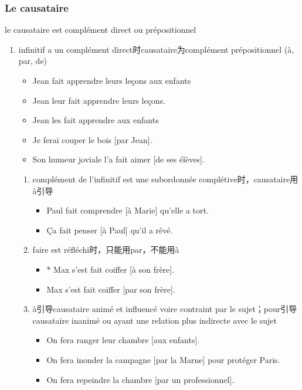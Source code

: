 \documentclass[UTF8]{report}
\begin{document}
\subsubsection{Le causataire}
le causataire est complément direct ou prépositionnel
\begin{enumerate}
    \item infinitif a un complément direct时causataire为complément prépositionnel (à, par, de)
    \begin{itemize}
        \item Jean fait apprendre leurs leçons aux enfants
        \item Jean leur fait apprendre leurs leçons.
        \item Jean les fait apprendre aux enfants
        \item Je ferai couper le bois [par Jean].
        \item Son humeur joviale l’a fait aimer [de ses élèves].
    \end{itemize}
    \begin{enumerate}
        \item complément de l’infinitif est une subordonnée complétive时，causataire用à引导
        \begin{itemize}
            \item Paul fait comprendre [à Marie] qu’elle a tort.
            \item Ça fait penser [à Paul] qu’il a rêvé.
        \end{itemize}
        \item faire est réfléchi时，只能用par，不能用à
        \begin{itemize}
            \item * Max s’est fait coiffer [à son frère].
            \item Max s’est fait coiffer [par son frère].
        \end{itemize}
        \item à引导causataire animé et influencé voire contraint par le sujet；pour引导causataire inanimé ou ayant une relation plus indirecte avec le sujet
        \begin{itemize}
            \item On fera ranger leur chambre [aux enfants].
            \item On fera inonder la campagne [par la Marne] pour protéger Paris.
            \item On fera repeindre la chambre [par un professionnel].
        \end{itemize}

\end{enumerate}
\end{enumerate}
\end{document}
